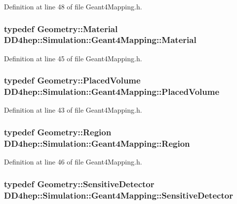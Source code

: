 Definition at line 48 of file Geant4Mapping.h.\hypertarget{class_d_d4hep_1_1_simulation_1_1_geant4_mapping_a2539031128388f894af24898eb6189a7}{
\subsubsection[{Material}]{\setlength{\rightskip}{0pt plus 5cm}typedef {\bf Geometry::Material} {\bf DD4hep::Simulation::Geant4Mapping::Material}}}
\label{class_d_d4hep_1_1_simulation_1_1_geant4_mapping_a2539031128388f894af24898eb6189a7}


Definition at line 45 of file Geant4Mapping.h.\hypertarget{class_d_d4hep_1_1_simulation_1_1_geant4_mapping_a2cad95da5f969a6b67fb6d6944549ad6}{
\subsubsection[{PlacedVolume}]{\setlength{\rightskip}{0pt plus 5cm}typedef {\bf Geometry::PlacedVolume} {\bf DD4hep::Simulation::Geant4Mapping::PlacedVolume}}}
\label{class_d_d4hep_1_1_simulation_1_1_geant4_mapping_a2cad95da5f969a6b67fb6d6944549ad6}


Definition at line 43 of file Geant4Mapping.h.\hypertarget{class_d_d4hep_1_1_simulation_1_1_geant4_mapping_a48f9337eb1105d5874835c20456a652d}{
\subsubsection[{Region}]{\setlength{\rightskip}{0pt plus 5cm}typedef {\bf Geometry::Region} {\bf DD4hep::Simulation::Geant4Mapping::Region}}}
\label{class_d_d4hep_1_1_simulation_1_1_geant4_mapping_a48f9337eb1105d5874835c20456a652d}


Definition at line 46 of file Geant4Mapping.h.\hypertarget{class_d_d4hep_1_1_simulation_1_1_geant4_mapping_ae27ee51d13bf8ae59e8bee3fcecdbc85}{
\subsubsection[{SensitiveDetector}]{\setlength{\rightskip}{0pt plus 5cm}typedef {\bf Geometry::SensitiveDetector} {\bf DD4hep::Simulation::Geant4Mapping::SensitiveDetector}}}
\label{class_d_d4hep_1_1_simulation_1_1_geant4_mapping_ae27ee51d13bf8ae59e8bee3fcecdbc85}


